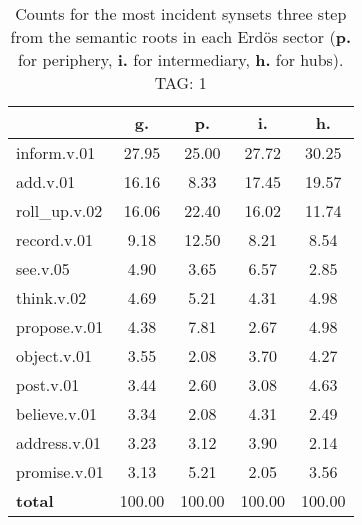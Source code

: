 \begin{table}[h!]
\begin{center}
\begin{tabular}{| l || c | c | c | c |}\hline
 & {\bf g.} & {\bf p.} & {\bf i.} & {\bf h.} \\\hline\hline
inform.v.01 & 27.95  & 25.00  & 27.72  & 30.25 \\\hline
add.v.01 & 16.16  & 8.33  & 17.45  & 19.57 \\\hline
roll\_up.v.02 & 16.06  & 22.40  & 16.02  & 11.74 \\\hline
record.v.01 & 9.18  & 12.50  & 8.21  & 8.54 \\\hline
see.v.05 & 4.90  & 3.65  & 6.57  & 2.85 \\\hline
think.v.02 & 4.69  & 5.21  & 4.31  & 4.98 \\\hline
propose.v.01 & 4.38  & 7.81  & 2.67  & 4.98 \\\hline
object.v.01 & 3.55  & 2.08  & 3.70  & 4.27 \\\hline
post.v.01 & 3.44  & 2.60  & 3.08  & 4.63 \\\hline
believe.v.01 & 3.34  & 2.08  & 4.31  & 2.49 \\\hline
address.v.01 & 3.23  & 3.12  & 3.90  & 2.14 \\\hline
promise.v.01 & 3.13  & 5.21  & 2.05  & 3.56 \\\hline\hline
{{\bf total}} & 100.00  & 100.00  & 100.00  & 100.00 \\\hline
\end{tabular}
\caption{Counts for the most incident synsets three step from the semantic roots in each Erd\"os sector ({\bf p.} for periphery, {\bf i.} for intermediary, {\bf h.} for hubs). TAG: 1}
\end{center}
\end{table}